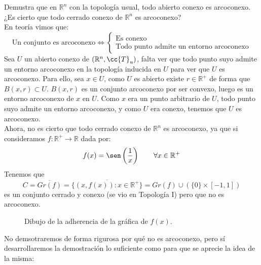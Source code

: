 \begin{ejercicio}
   Demustra que en $\mathbb{R}^n$  con la topología usual, todo abierto conexo es arcoconexo. ¿Es cierto que todo cerrado conexo de $\mathbb{R}^n$ es arcoconexo?\\

   \noindent
   En teoría vimos que:
   \begin{equation*}
       \text{Un conjunto es arcoconexo} \Longleftrightarrow \left\{\begin{array}{l}
           \text{Es conexo} \\
           \text{Todo punto admite un entorno arcoconexo}
       \end{array}\right.
   \end{equation*}
   Sea $U$ un abierto conexo de $(\mathbb{R}^n, \cc{T}_u)$, falta ver que todo punto suyo admite un entorno arcoconexo en la topología inducida en $U$ para ver que $U$ es arcoconexo. Para ello, sea $x\in U$, como $U$ es abierto existe $r\in \mathbb{R}^+$ de forma que $B(x,r)\subset U$. $B(x,r)$ es un conjunto arcoconexo por ser convexo, luego es un entorno arcoconexo de $x$ en $U$. Como $x$ era un punto arbitrario de $U$, todo punto suyo admite un entorno arcoconexo, y como $U$ era conexo, tenemos que $U$ es arcoconexo.\\

   \noindent
   Ahora, no es cierto que todo cerrado conexo de $\mathbb{R}^n$ es arcoconexo, ya que si consideramos $f:\mathbb{R}^+\to \mathbb{R}$ dada por:
   \begin{equation*}
       f(x) = \sen\left(\dfrac{1}{x}\right) \qquad \forall x\in \mathbb{R}^+
   \end{equation*}
   Tenemos que
   \begin{equation*}
       C = \overline{Gr(f)} = \overline{\{(x,f(x)) : x\in \mathbb{R}^+\}} = Gr(f) \cup (\{0\}\times [-1,1])
   \end{equation*}
   es un conjunto cerrado y conexo (se vio en Topología I) pero que no es arcoconexo.

   \begin{figure}[H]
       \centering
        \caption{Dibujo de la adherencia de la gráfica de $f(x)$.}
   \end{figure}
   No demsotraremos de forma rigurosa por qué no es arcoconexo, pero sí desarrollaremos la demostración lo suficiente como para que se aprecie la idea de la misma:


\end{ejercicio}
